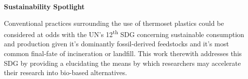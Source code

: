 \begin{center}
    \begin{large}
        \textbf{Sustainability Spotlight}
    \end{large}
    \begin{justify}
        \begin{normalsize}
            Conventional practices surrounding the use of thermoset plastics
             could be considered at odds with the UN's 12\textsuperscript{th}
             SDG concerning sustainable consumption and production given it's
             dominantly fossil-derived feedstocks and it's most common 
             final-fate of incineration or landfill.
            This work therewith addresses this SDG by providing a elucidating
             the means by which researchers may accelerate their research into
             bio-based alternatives.
        \end{normalsize}
    \end{justify}
\end{center}
